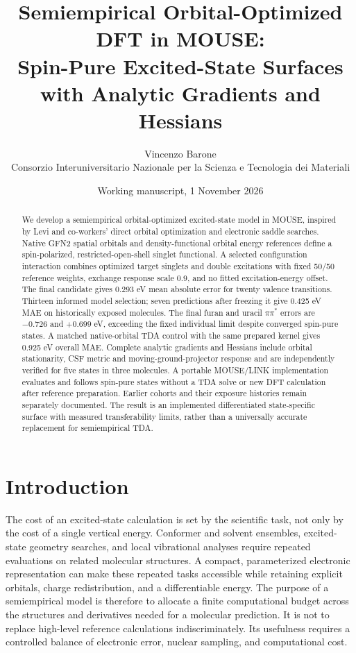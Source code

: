 \documentclass[11pt,a4paper]{article}
\title{Semiempirical Orbital-Optimized DFT in MOUSE:\\Spin-Pure Excited-State Surfaces with Analytic Gradients and Hessians}
\author{Vincenzo Barone\\\small Consorzio Interuniversitario Nazionale per la Scienza e Tecnologia dei Materiali}
\date{Working manuscript, 1 November 2026}
\begin{document}
\maketitle
\begin{abstract}
We develop a semiempirical orbital-optimized excited-state model in MOUSE,
inspired by Levi and co-workers' direct orbital optimization and electronic
saddle searches. Native GFN2 spatial orbitals and density-functional orbital
energy references define a spin-polarized, restricted-open-shell singlet
functional. A selected configuration interaction combines optimized target
singlets and double excitations with fixed 50/50 reference weights, exchange
response scale 0.9, and no fitted excitation-energy offset. The final candidate
gives 0.293 eV mean absolute error for twenty valence transitions. Thirteen
informed model selection; seven predictions after freezing it give 0.425 eV
MAE on historically exposed molecules. The final furan and uracil $\pi\pi^*$
errors are $-0.726$ and $+0.699$ eV, exceeding the fixed individual limit despite
converged spin-pure states. A matched native-orbital TDA control with the same
prepared kernel gives 0.925 eV overall MAE. Complete analytic gradients and
Hessians include orbital stationarity, CSF metric and moving-ground-projector
response and are independently verified for five states in three molecules.
A portable MOUSE/LINK implementation evaluates and follows spin-pure states
without a TDA solve or new DFT calculation after reference preparation.
Earlier cohorts and their exposure histories remain separately documented.
The result is an implemented differentiated state-specific surface with
measured transferability limits, rather than a universally accurate replacement
for semiempirical TDA.
\end{abstract}

\section{Introduction}
The cost of an excited-state calculation is set by the scientific task, not only by the cost of a single vertical energy. Conformer and solvent ensembles, excited-state geometry searches, and local vibrational analyses require repeated evaluations on related molecular structures. A compact, parameterized electronic representation can make these repeated tasks accessible while retaining explicit orbitals, charge redistribution, and a differentiable energy. The purpose of a semiempirical model is therefore to allocate a finite computational budget across the structures and derivatives needed for a molecular prediction. It is not to replace high-level reference calculations indiscriminately. Its usefulness requires a controlled balance of electronic error, nuclear sampling, and computational cost.
\end{document}
